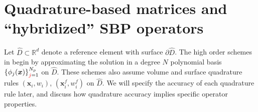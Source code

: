 \documentclass{svjour3}                     %
\renewcommand{\hat}{\widehat}
\newcommand{\LRp}[1]{\left( #1 \right)}
\newcommand{\LRc}[1]{\left\{ #1 \right\}}
\renewcommand{\note}[1]{{\color{blue}{#1}}}
\newcommand{\rnote}[1]{{\color{red}{#1}}}
\begin{document}



\section{Quadrature-based matrices and ``hybridized'' SBP operators}
\label{sec:sbp}
Let $\hat{D} \subset\mathbb{R}^d$ denote a reference element with surface $\partial \hat{D}$.  
The high order schemes in \cite{chan2017discretely, chan2018discretely} begin by approximating the solution in a degree $N$ polynomial basis $\LRc{\phi_j({\bm{x}})}_{\rnote{j}=1}^{N_p}$ on $\hat{D}$.  These schemes also assume volume and surface quadrature rules $({\bm{x}}_i, w_i)$, $\LRp{{\bm{x}}^f_i,w^f_i}$ on $\hat{D}$.  We will specify the accuracy of each quadrature rule later, and discuss how quadrature accuracy implies specific operator properties.  
\end{document}
